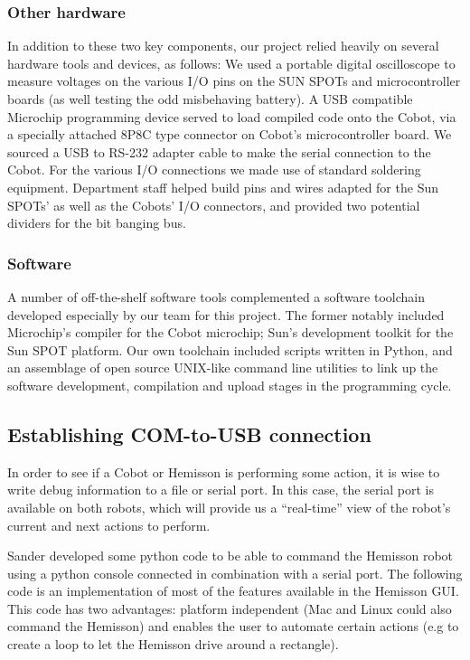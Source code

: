 \documentclass[a4paper,10pt]{article} %
\begin{document}
\subsubsection{Other hardware}

\noindent In addition to these two key components, our project relied heavily on
several hardware tools and devices, as follows: We used a portable digital
oscilloscope to measure voltages on the various I/O pins on the SUN SPOTs and
microcontroller boards (as well testing the odd misbehaving battery). A USB
compatible Microchip programming device served to load compiled code onto the
Cobot, via a specially attached 8P8C type connector on Cobot's microcontroller
board. We sourced a USB to RS-232 adapter cable to make the serial connection to
the Cobot. For the various I/O connections we made use of standard soldering
equipment. Department staff helped build pins and wires adapted for the Sun
SPOTs' as well as the Cobots' I/O connectors, and provided two potential
dividers for the bit banging bus.

\subsubsection{Software}

A number of off-the-shelf software tools complemented a software toolchain
developed especially by our team for this project. The former notably included
Microchip's compiler for the Cobot microchip; Sun's development toolkit for the
Sun SPOT platform. Our own toolchain included scripts written in Python, and an
assemblage of open source UNIX-like command line utilities to link up the
software development, compilation and upload stages in the programming cycle.


\subsection{Establishing COM-to-USB connection} %
\label{sub:Establishing COM-to-USB connection}

In order to see if a Cobot or Hemisson is performing some action, it is wise to
write debug information to a file or serial port. In this case, the serial port
is available on both robots, which will provide us a ``real-time'' view of the
robot's current and next actions to perform.

Sander developed some python code to be able to command the Hemisson robot using
a python console connected in combination with a serial port. The following code
is an implementation of most of the features available in the Hemisson GUI.
This code has two advantages: platform independent (Mac and Linux could also
command the Hemisson) and enables the user to automate certain actions (e.g to
create a loop to let the Hemisson drive around a rectangle).
\end{document}
